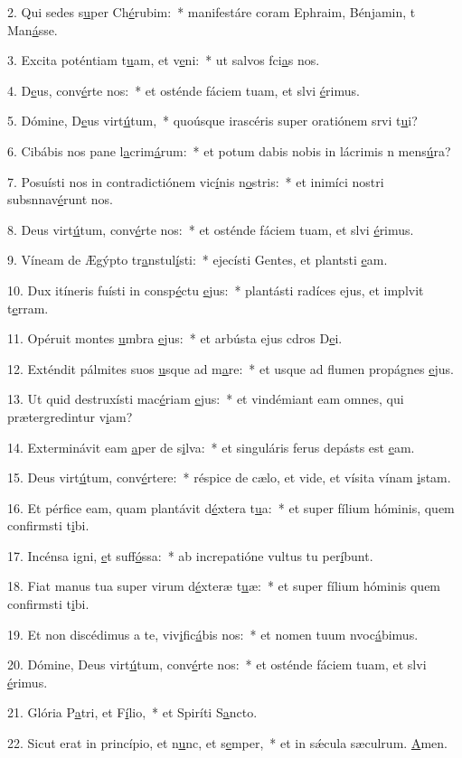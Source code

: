 2. Qui sedes s\uline{u}per Ch\uline{é}rubim:~* manifestáre coram Ephraim, Bénjamin, t Man\uline{á}sse.\par 
3. Excita poténtiam t\uline{u}am, et v\uline{e}ni:~* ut salvos fci\uline{a}s nos.\par 
4. D\uline{e}us, conv\uline{é}rte nos:~* et osténde fáciem tuam, et slvi \uline{é}rimus.\par 
5. Dómine, D\uline{e}us virt\uline{ú}tum,~* quoúsque irascéris super oratiónem srvi t\uline{u}i?\par 
6. Cibábis nos pane l\uline{a}crim\uline{á}rum:~* et potum dabis nobis in lácrimis n mens\uline{ú}ra?\par 
7. Posuísti nos in contradictiónem vic\uline{í}nis n\uline{o}stris:~* et inimíci nostri subsnnav\uline{é}runt nos.\par 
8. Deus virt\uline{ú}tum, conv\uline{é}rte nos:~* et osténde fáciem tuam, et slvi \uline{é}rimus.\par 
9. Víneam de Ægýpto tr\uline{a}nstul\uline{í}sti:~* ejecísti Gentes, et plantsti \uline{e}am.\par 
10. Dux itíneris fuísti in consp\uline{é}ctu \uline{e}jus:~* plantásti radíces ejus, et implvit t\uline{e}rram.\par 
11. Opéruit montes \uline{u}mbra \uline{e}jus:~* et arbústa ejus cdros D\uline{e}i.\par 
12. Exténdit pálmites suos \uline{u}sque ad m\uline{a}re:~* et usque ad flumen propágnes \uline{e}jus.\par 
13. Ut quid destruxísti mac\uline{é}riam \uline{e}jus:~* et vindémiant eam omnes, qui prætergredintur v\uline{i}am?\par 
14. Exterminávit eam \uline{a}per de s\uline{i}lva:~* et singuláris ferus depásts est \uline{e}am.\par 
15. Deus virt\uline{ú}tum, conv\uline{é}rtere:~* réspice de cælo, et vide, et vísita vínam \uline{i}stam.\par 
16. Et pérfice eam, quam plantávit d\uline{é}xtera t\uline{u}a:~* et super fílium hóminis, quem confirmsti t\uline{i}bi.\par 
17. Incénsa igni, \uline{e}t suff\uline{ó}ssa:~* ab increpatióne vultus tu per\uline{í}bunt.\par 
18. Fiat manus tua super virum d\uline{é}xteræ t\uline{u}æ:~* et super fílium hóminis quem confirmsti t\uline{i}bi.\par 
19. Et non discédimus a te, viv\uline{i}fic\uline{á}bis nos:~* et nomen tuum nvoc\uline{á}bimus.\par 
20. Dómine, Deus virt\uline{ú}tum, conv\uline{é}rte nos:~* et osténde fáciem tuam, et slvi \uline{é}rimus.\par 
21. Glória P\uline{a}tri, et F\uline{í}lio,~* et Spiríti S\uline{a}ncto.\par 
22. Sicut erat in princípio, et n\uline{u}nc, et s\uline{e}mper,~* et in sǽcula sæculrum. \uline{A}men.\par 
